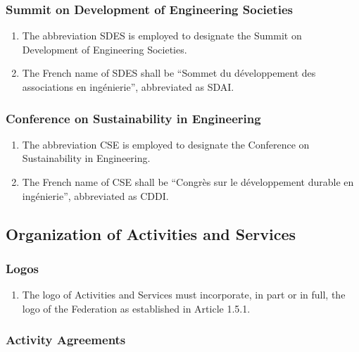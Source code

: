 \subsubsection{Summit on Development of Engineering Societies}
\label{summit-on-development-of-engineering-societies}
\begin{enumerate}

 \item The abbreviation SDES is employed to designate the Summit on Development of Engineering Societies.
 \item The French name of SDES shall be “Sommet du développement des associations en ingénierie”, abbreviated as SDAI.
\end{enumerate}

\subsubsection{Conference on Sustainability in Engineering}
\label{conference-on-sustainability-in-engineering}
\begin{enumerate}

 \item The abbreviation CSE is employed to designate the Conference on Sustainability in Engineering.
 \item The French name of CSE shall be “Congrès sur le développement durable en ingénierie”, abbreviated as CDDI.
\end{enumerate}

\subsection{Organization of Activities and Services}
\label{organization-of-activities-and-services}

\subsubsection{Logos}
\label{logos}
\begin{enumerate}
 \item The logo of Activities and Services must incorporate, in part or in full, the logo of the Federation as established in Article 1.5.1.
\end{enumerate}

\subsubsection{Activity Agreements}
\label{activity-agreements}

